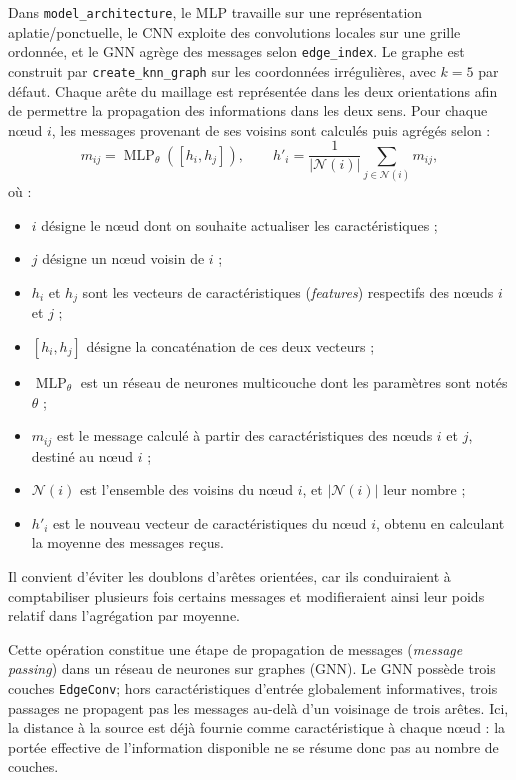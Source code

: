\documentclass[11pt,a4paper]{article}
\begin{document}
Dans \texttt{model\_architecture}, le MLP travaille sur une représentation aplatie/ponctuelle, le CNN exploite des convolutions locales sur une grille ordonnée, et le GNN agrège des messages selon \texttt{edge\_index}. Le graphe est construit par \texttt{create\_knn\_graph} sur les coordonnées irrégulières, avec $k=5$ par défaut. 
Chaque arête du maillage est représentée dans les deux orientations
afin de permettre la propagation des informations dans les deux sens.
Pour chaque nœud $i$, les messages provenant de ses voisins sont
calculés puis agrégés selon :
\[
m_{ij} = \operatorname{MLP}_{\theta}([h_i,h_j]),
\qquad
h'_i = \frac{1}{|\mathcal{N}(i)|}
\sum_{j \in \mathcal{N}(i)} m_{ij},
\]
où :
\begin{itemize}
    \item $i$ désigne le nœud dont on souhaite actualiser les
    caractéristiques ;
    \item $j$ désigne un nœud voisin de $i$ ;
    \item $h_i$ et $h_j$ sont les vecteurs de caractéristiques
    (\textit{features}) respectifs des nœuds $i$ et $j$ ;
    \item $[h_i,h_j]$ désigne la concaténation de ces deux vecteurs ;
    \item $\operatorname{MLP}_{\theta}$ est un réseau de neurones
    multicouche dont les paramètres sont notés $\theta$ ;
    \item $m_{ij}$ est le message calculé à partir des
    caractéristiques des nœuds $i$ et $j$, destiné au nœud $i$ ;
    \item $\mathcal{N}(i)$ est l'ensemble des voisins du nœud $i$,
    et $|\mathcal{N}(i)|$ leur nombre ;
    \item $h'_i$ est le nouveau vecteur de caractéristiques du
    nœud $i$, obtenu en calculant la moyenne des messages reçus.
\end{itemize}

Il convient d'éviter les doublons d'arêtes orientées, car ils
conduiraient à comptabiliser plusieurs fois certains messages
et modifieraient ainsi leur poids relatif dans l'agrégation
par moyenne.

Cette opération constitue une étape de propagation de messages
(\textit{message passing}) dans un réseau de neurones sur
graphes (GNN).
Le GNN possède trois couches \texttt{EdgeConv}; hors caractéristiques d'entrée globalement informatives, trois passages ne propagent pas les messages au-delà d'un voisinage de trois arêtes. Ici, la distance à la source est déjà fournie comme caractéristique à chaque nœud : la portée effective de l'information disponible ne se résume donc pas au nombre de couches.
\begin{center}\end{center}
\end{document}

